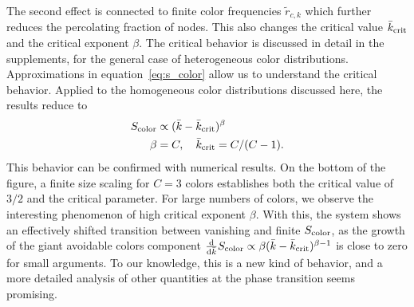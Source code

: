 \documentclass[aps, pre, twocolumn, a4paper, floatfix]{revtex4}
\begin{document}
{The second effect is connected to finite color frequencies ${\tilde r}_{c,k}$ which further reduces the percolating 
fraction of nodes. This also changes the critical value ${\bar k}_{\rm crit}$ and the critical exponent 
$\beta$. The critical behavior is discussed in detail in the supplements, for the general case of heterogeneous color 
distributions. Approximations in equation~\ref{eq:s_color} allow us to understand the critical behavior. 
Applied to the homogeneous color distributions discussed here, the results reduce to 
\begin{align}
S_{\rm color} &\propto ({\bar k}-{\bar k}_{\rm crit})^{\beta}\\
\beta&=C,\quad {\bar k}_{\rm crit} = C/(C-1).
\end{align}
This behavior can be confirmed with numerical results. On the bottom of the figure, a finite size 
scaling for $C=3$ colors establishes both the critical value of $3/2$ and the critical parameter.
For large numbers of colors, we observe the interesting phenomenon of high critical exponent 
$\beta$. With this, the system shows an effectively shifted transition between vanishing and finite $S_{\rm color}$, 
as the growth of the giant avoidable colors component 
$\frac{\rm d}{{\rm d} {\bar k}}S_{\rm color}\propto \beta ({\bar k}-{\bar k}_{\rm crit})^{\beta-1}$ 
is close to zero for small arguments. To our knowledge, this is a new kind of behavior, and a more 
detailed analysis of other quantities at the phase transition seems promising. 





}
\end{document}
